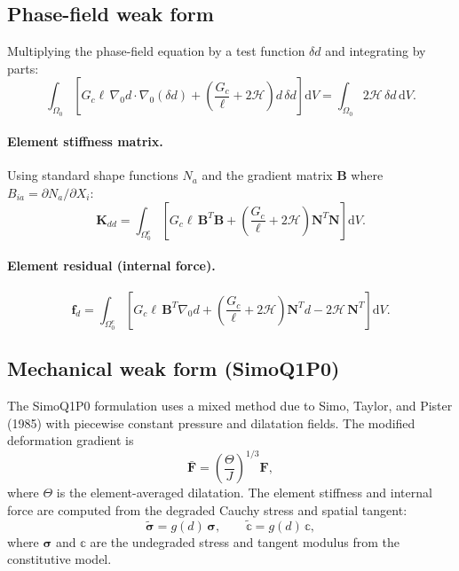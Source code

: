 \documentclass[11pt,a4paper]{article}
\newcommand{\FF}{\bm{F}}
\newcommand{\ssigma}{\bm{\sigma}}
\newcommand{\Grad}{\nabla_{\!0}}
\newcommand{\diff}{\mathrm{d}}
\begin{document}
\subsection{Phase-field weak form}

Multiplying the phase-field equation by a test function $\delta d$ and integrating by parts:
\begin{equation}
    \int_{\Omega_0} \left[ G_c \ell\, \Grad d \cdot \Grad(\delta d) + \left(\frac{G_c}{\ell} + 2\mathcal{H}\right) d\, \delta d \right] \diff V = \int_{\Omega_0} 2\mathcal{H}\, \delta d \, \diff V.
\end{equation}

\paragraph{Element stiffness matrix.} Using standard shape functions $N_a$ and the gradient matrix $\bm{B}$ where $B_{ia} = \partial N_a / \partial X_i$:
\begin{equation}
    \bm{K}_{dd} = \int_{\Omega_0^e} \left[ G_c \ell\, \bm{B}^T \bm{B} + \left(\frac{G_c}{\ell} + 2\mathcal{H}\right) \bm{N}^T \bm{N} \right] \diff V.
\end{equation}

\paragraph{Element residual (internal force).}
\begin{equation}
    \bm{f}_d = \int_{\Omega_0^e} \left[ G_c \ell\, \bm{B}^T \Grad d + \left(\frac{G_c}{\ell} + 2\mathcal{H}\right) \bm{N}^T d - 2\mathcal{H}\, \bm{N}^T \right] \diff V.
\end{equation}

\subsection{Mechanical weak form (SimoQ1P0)}

The SimoQ1P0 formulation uses a mixed method due to Simo, Taylor, and Pister (1985) with piecewise constant pressure and dilatation fields. The modified deformation gradient is
\begin{equation}
    \bar{\FF} = \left(\frac{\Theta}{J}\right)^{1/3} \FF,
\end{equation}
where $\Theta$ is the element-averaged dilatation. The element stiffness and internal force are computed from the degraded Cauchy stress and spatial tangent:
\begin{equation}
    \tilde{\ssigma} = g(d)\, \ssigma, \qquad \tilde{\mathbb{c}} = g(d)\, \mathbb{c},
\end{equation}
where $\ssigma$ and $\mathbb{c}$ are the undegraded stress and tangent modulus from the constitutive model.
\end{document}

